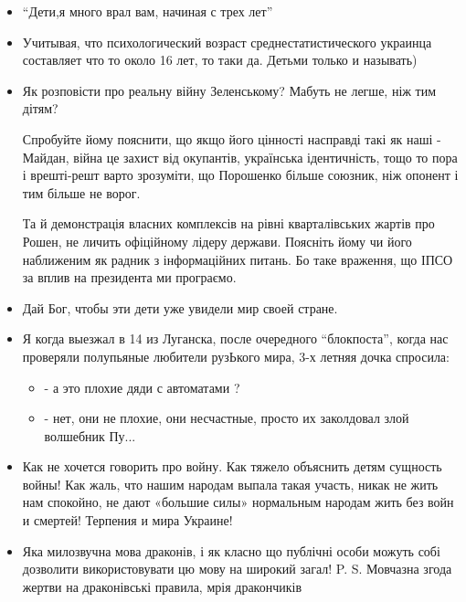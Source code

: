 \begin{itemize}

\item {}
\enquote{Дети,я много врал вам, начиная с трех лет}

\item {}
Учитывая, что психологический возраст среднестатистического украинца составляет
что то около 16 лет, то таки да. Детьми только и называть)

\item {}
Як розповісти про реальну війну Зеленському? Мабуть не легше, ніж тим дітям?

Спробуйте йому пояснити, що якщо його цінності насправді такі як наші - Майдан,
війна це захист від окупантів, українська ідентичність, тощо то
пора і врешті-решт варто зрозуміти, що Порошенко більше
союзник, ніж опонент і тим більше не ворог.

Та й демонстрація власних комплексів на рівні кварталівських жартів про Рошен,
не личить офіційному лідеру держави. Поясніть йому чи його
наближеним як радник з інформаційних питань. Бо таке враження,
що ІПСО за вплив на президента ми програємо.

\item {}
Дай Бог, чтобы эти дети уже увидели мир своей стране.

\item {}

Я когда выезжал в 14 из Луганска, после очередного \enquote{блокпоста}, когда нас
проверяли полупьяные любители рузЬкого мира, 3-х летняя дочка
спросила:
\begin{itemize}
  \item - а это плохие дяди с автоматами ?
  \item - нет, они не плохие, они несчастные, просто их заколдовал злой волшебник Пу...
\end{itemize}

\item {}
Как не хочется говорить про войну. Как тяжело объяснить детям сущность войны! Как жаль, что нашим народам выпала такая участь, никак не жить нам спокойно, не дают «большие силы» нормальным народам жить без войн и смертей!
Терпения и мира Украине!

\item {}

Яка милозвучна мова драконів, і як класно що публічні особи можуть собі
дозволити використовувати цю мову на широкий загал!  P. S.
Мовчазна згода жертви на драконівські правила, мрія дракончиків


\end{itemize}
